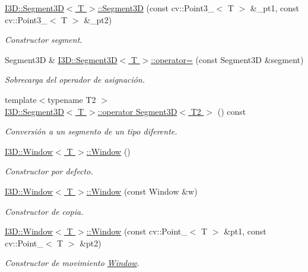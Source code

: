 \begin{DoxyCompactItemize}
\hyperlink{group___geometric_entities_ga7a2024be1820ddc19158004932d79882}{I3\+D\+::\+Segment3\+D$<$ T $>$\+::\+Segment3D} (const cv\+::\+Point3\+\_\+$<$ T $>$ \&\+\_\+pt1, const cv\+::\+Point3\+\_\+$<$ T $>$ \&\+\_\+pt2)
\begin{DoxyCompactList}\small\item\em Constructor segment. \end{DoxyCompactList}\item 
Segment3D \& \hyperlink{group___geometric_entities_gaa95bd137286b52bc178a569720bea3d6}{I3\+D\+::\+Segment3\+D$<$ T $>$\+::operator=} (const Segment3D \&segment)
\begin{DoxyCompactList}\small\item\em Sobrecarga del operador de asignación. \end{DoxyCompactList}\item 
{\footnotesize template$<$typename T2 $>$ }\\\hyperlink{group___geometric_entities_ga0a05ef1543e77df2c3dc9e40d2126b28}{I3\+D\+::\+Segment3\+D$<$ T $>$\+::operator Segment3\+D$<$ T2 $>$} () const 
\begin{DoxyCompactList}\small\item\em Conversión a un segmento de un tipo diferente. \end{DoxyCompactList}\item 
\hyperlink{group___geometric_entities_ga2d226aaf94cc5ed88652f78ef8403820}{I3\+D\+::\+Window$<$ T $>$\+::\+Window} ()
\begin{DoxyCompactList}\small\item\em Constructor por defecto. \end{DoxyCompactList}\item 
\hyperlink{group___geometric_entities_ga029382701e212fdcae3b72350bb7d9cb}{I3\+D\+::\+Window$<$ T $>$\+::\+Window} (const Window \&w)
\begin{DoxyCompactList}\small\item\em Constructor de copia. \end{DoxyCompactList}\item 
\hyperlink{group___geometric_entities_gaad67f178a66be3d3555c75c9999f2403}{I3\+D\+::\+Window$<$ T $>$\+::\+Window} (const cv\+::\+Point\+\_\+$<$ T $>$ \&pt1, const cv\+::\+Point\+\_\+$<$ T $>$ \&pt2)
\begin{DoxyCompactList}\small\item\em Constructor de movimiento \hyperlink{class_i3_d_1_1_window}{Window}. \end{DoxyCompactList}\item 

\end{DoxyCompactItemize}
